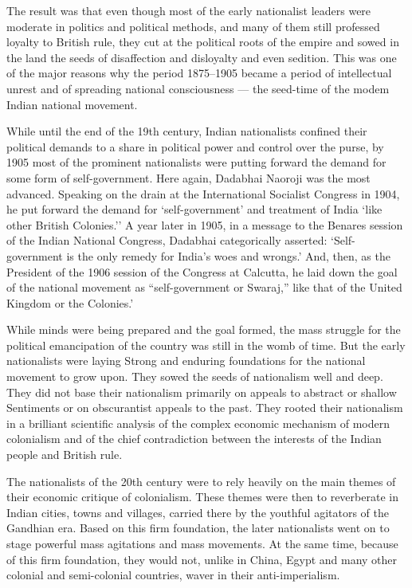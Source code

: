 \begin{multicols}{2}
The result was that even though most of the early nationalist leaders were moderate in politics and political methods, and many of them still professed loyalty to British rule, they cut at the political roots of the empire and sowed in the land the seeds of disaffection and disloyalty and even sedition. This was one of the major reasons why the period 1875--1905 became a period of intellectual unrest and of spreading national consciousness --- the seed-time of the modem Indian national movement.

While until the end of the 19th century, Indian nationalists confined their political demands to a share in political power and control over the purse, by 1905 most of the prominent nationalists were putting forward the demand for some form of self-government. Here again, Dadabhai Naoroji was the most advanced. Speaking on the drain at the International Socialist Congress in 1904, he put forward the demand for `self-government' and treatment of India `like other British Colonies.'' A year later in 1905, in a message to the Benares session of the Indian National Congress, Dadabhai categorically asserted: `Self-government is the only remedy for India's woes and wrongs.' And, then, as the President of the 1906 session of the Congress at Calcutta, he laid down the goal of the national movement as ``self-government or Swaraj,'' like that of the United Kingdom or the Colonies.'

While minds were being prepared and the goal formed, the mass struggle for the political emancipation of the country was still in the womb of time. But the early nationalists were laying Strong and enduring foundations for the national movement to grow upon. They sowed the seeds of nationalism well and deep. They did not base their nationalism primarily on appeals to abstract or shallow Sentiments or on obscurantist appeals to the past. They rooted their nationalism in a brilliant scientific analysis of the complex economic mechanism of modern colonialism and of the chief contradiction between the interests of the Indian people and British rule.

The nationalists of the 20th century were to rely heavily on the main themes of their economic critique of colonialism. These themes were then to reverberate in Indian cities, towns and villages, carried there by the youthful agitators of the Gandhian era. Based on this firm foundation, the later nationalists went on to stage powerful mass agitations and mass movements. At the same time, because of this firm foundation, they would not, unlike in China, Egypt and many other colonial and semi-colonial countries, waver in their anti-imperialism.
\end{multicols}